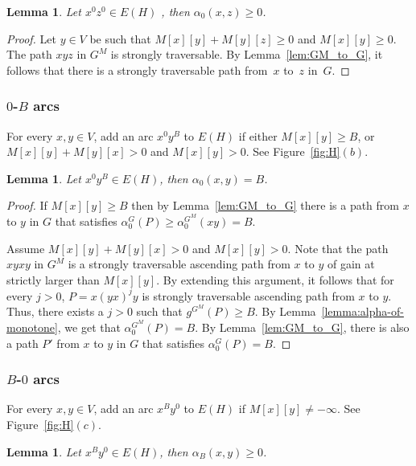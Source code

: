 \documentclass[11pt]{article}
\newtheorem{lemma}[theorem]{Lemma}
\begin{document}
\begin{lemma}\label{lemma:0-0}
    Let $x^0 z^0 \in E(H)$ , then $\alpha_0(x,z) \ge 0$. 
\end{lemma}

\begin{proof}
    Let $y\in V$ be such that $M[x][y]+M[y][z]\ge 0$ and $M[x][y]\ge 0$. The path $xyz$ in $G^M$ is strongly traversable. 
    By Lemma~\ref{lem:GM_to_G}, it follows that there is a strongly traversable path from~$x$ to~$z$ in~$G$.
\end{proof}


\subsubsection{\texorpdfstring{$0$-$B$}{0-B} arcs}
For every $x,y\in V$, add an arc $x^0 y^B$ to $E(H)$ if either $M[x][y]\ge B$, or $M[x][y]+M[y][x]>0$ and $M[x][y]>0$. See Figure~\ref{fig:H}$(b)$.

\begin{lemma}\label{lemma:0-B}
    Let $x^0 y^B\in E(H)$, then $\alpha_0(x,y) = B$.
\end{lemma}

\begin{proof}
    If $M[x][y] \ge B$ then by Lemma~\ref{lem:GM_to_G} there is a path from $x$ to $y$ in $G$ that satisfies $\alpha^G_0(P) \ge \alpha^{G^M}_0(xy)=B$.

    Assume $M[x][y] + M[y][x] >0$ and $M[x][y] > 0$. Note that the path $xyxy$ in $G^M$ is a strongly traversable ascending path from $x$ to $y$ of gain at strictly larger than $M[x][y]$. By extending this argument, it follows that for every $j>0$, $P=x(yx)^j y$ is strongly traversable ascending path from $x$ to $y$. Thus, there exists a $j>0$ such that $g^{G^M}(P)\ge B$. By Lemma~\ref{lemma:alpha-of-monotone}, we get that $\alpha^{G^M}_0(P)= B$. By Lemma~\ref{lem:GM_to_G}, there is also a path $P'$ from $x$ to $y$ in $G$ that satisfies $\alpha^G_0(P)=B$.
\end{proof}


\subsubsection{\texorpdfstring{$B$-$0$}{B-0} arcs}
For every $x,y\in V$, add an arc $x^B y^0$ to $E(H)$ if $M[x][y] \neq -\infty$. See Figure~\ref{fig:H}$(c)$.

\begin{lemma}\label{lemma:B-0}
    Let $x^B y^0 \in E(H)$, then $\alpha_B(x,y)\ge 0$. 
\end{lemma}
\end{document}
